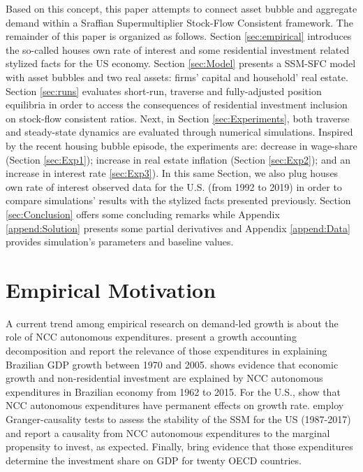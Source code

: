 \documentclass[11pt]{article}
\begin{document}
Based on this concept, this paper attempts to connect asset bubble and aggregate demand within a Sraffian Supermultiplier Stock-Flow Consistent framework. 
The remainder of this paper is organized as follows.
Section \ref{sec:empirical} introduces the so-called houses own rate of interest and some residential investment related stylized facts for the US economy.
Section \ref{sec:Model} presents a SSM-SFC model  with asset bubbles and two real assets: firms' capital and household' real estate. 
Section \ref{sec:runs} evaluates short-run, traverse and fully-adjusted position equilibria in order to access the consequences of residential investment inclusion on stock-flow consistent ratios.
Next, in Section \ref{sec:Experiments}, both traverse and steady-state dynamics are evaluated through numerical simulations.
Inspired by the recent housing bubble episode, the experiments are: decrease in wage-share (Section \ref{sec:Exp1}); increase in real estate inflation (Section \ref{sec:Exp2}); and an increase in interest rate \ref{sec:Exp3}).
In this same Section, we also plug houses own rate of interest observed data for the U.S. (from 1992 to 2019) in order to compare simulations' results with the stylized facts presented previously.
Section \ref{sec:Conclusion} offers some concluding remarks while Appendix \ref{append:Solution} presents some partial derivatives and Appendix \ref{append:Data} provides simulation's parameters and baseline values.



\section{Empirical Motivation}
\label{sec:orgcec45fe}
\label{sec:empirical}

A current trend among empirical research on demand-led growth is about the role of NCC autonomous expenditures.
\textcite{freitas_pattern_2013} present a growth accounting decomposition and report the relevance of those expenditures in explaining Brazilian GDP growth between 1970 and 2005. \textcite{braga_investment_2018} shows evidence that economic growth and non-residential investment are explained by NCC autonomous expenditures in Brazilian economy from 1962 to 2015. For the U.S., \textcite{girardi_long-run_2016} show that NCC autonomous expenditures have permanent effects on growth rate. 
\textcite{haluska_growth_2019} employ Granger-causality tests to assess the stability of the SSM for the US (1987-2017) and report a causality from NCC autonomous expenditures to the marginal propensity to invest, as expected.
Finally, \textcite{girardi_autonomous_2018} bring evidence that those expenditures determine the investment share on GDP for twenty OECD countries. 
\end{document}
